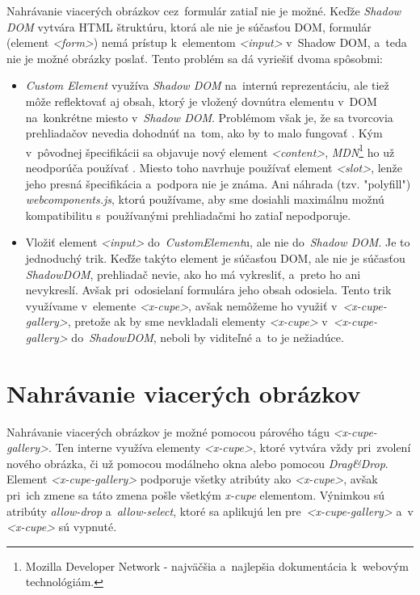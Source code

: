 Nahrávanie viacerých obrázkov cez~formulár zatiaľ nie je možné. Keďže \emph{Shadow DOM} vytvára HTML štruktúru, ktorá ale nie je súčasťou DOM, formulár (element \emph{<form>}) nemá prístup k~elementom \emph{<input>} v~Shadow DOM, a~teda nie je možné obrázky poslať. Tento problém sa dá vyriešiť dvoma spôsobmi:

\begin{itemize}
	\item \emph{Custom Element} využíva \emph{Shadow DOM} na~internú reprezentáciu, ale tiež môže reflektovať aj obsah, ktorý je vložený dovnútra elementu v~DOM na~konkrétne miesto v~\emph{Shadow DOM}. Problémom však je, že sa tvorcovia prehliadačov nevedia dohodnúť na~tom, ako by to malo fungovať \cite{WebComponents_state}. Kým v~pôvodnej špecifikácii sa objavuje nový element \emph{<content>}, \emph{MDN}\footnote{Mozilla Developer Network - najväčšia a~najlepšia dokumentácia k~webovým technológiám.} ho už neodporúča používať \cite{MDN_Content_Element}. Miesto toho navrhuje používať element \emph{<slot>}, lenže jeho presná špecifikácia a~podpora nie je známa. Ani náhrada (tzv. "polyfill") \emph{webcomponents.js}, ktorú používame, aby sme dosiahli maximálnu možnú kompatibilitu s~používanými prehliadačmi ho zatiaľ nepodporuje.
	\item Vložiť element \emph{<input>} do~\emph{CustomElement}u, ale nie do~\emph{Shadow DOM}. Je to jednoduchý trik. Keďže takýto element je súčasťou DOM, ale nie je súčasťou \emph{ShadowDOM}, prehliadač nevie, ako ho má vykresliť, a~preto ho ani nevykreslí. Avšak pri~odosielaní formulára jeho obsah odosiela. Tento trik využívame v~elemente \emph{<x-cupe>}, avšak nemôžeme ho využiť v~\emph{<x-cupe-gallery>}, pretože ak by sme nevkladali elementy \emph{<x-cupe>} v~\emph{<x-cupe-gallery>} do~\emph{ShadowDOM}, neboli by viditeľné a~to je nežiadúce.
\end{itemize}


\section{Nahrávanie viacerých obrázkov}

Nahrávanie viacerých obrázkov je možné pomocou párového tágu \emph{<x-cupe-gallery>}. Ten interne využíva elementy \emph{<x-cupe>}, ktoré vytvára vždy pri~zvolení nového obrázka, či už pomocou modálneho okna alebo pomocou \emph{Drag\&Drop}. Element \emph{<x-cupe-gallery>} podporuje všetky atribúty ako \emph{<x-cupe>}, avšak pri~ich zmene sa táto zmena pošle všetkým \emph{x-cupe} elementom. Výnimkou sú atribúty \emph{allow-drop} a~\emph{allow-select}, ktoré sa aplikujú len pre~\emph{<x-cupe-gallery>} a~v \emph{<x-cupe>} sú vypnuté.



